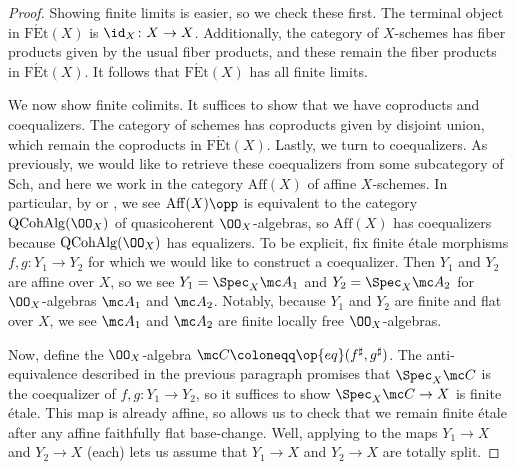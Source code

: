 \documentclass{amsart}
\begin{document}
\begin{proof}
    Showing finite limits is easier, so we check these first. The terminal object in $\mathrm{F\acute Et}(X)$ is $\id_X\colon X\to X$.
    Additionally, the category of $X$-schemes has fiber products given by the usual fiber products, and these remain the fiber products in $\mathrm{F\acute Et}(X)$. It follows that $\mathrm{F\acute Et}(X)$ has all finite limits.

    We now show finite colimits. It suffices to show that we have coproducts and coequalizers. The category of schemes has coproducts given by disjoint union, which remain the coproducts in $\mathrm{F\acute Et}(X)$.
    Lastly, we turn to coequalizers. As previously, we would like to retrieve these coequalizers from some subcategory of $\mathrm{Sch}$, and here we work in the category $\mathrm{Aff}(X)$ of affine $X$-schemes. In particular, by \cite[Exercise~II.5.17]{hartshorne} or \cite[\href{https://stacks.math.columbia.edu/tag/01SA}{Lemma 01SA}]{stacks}, we see $\mathrm{Aff}(X)\opp$ is equivalent to the category $\mathrm{QCohAlg}(\OO_X)$ of quasicoherent $\OO_X$-algebras, so $\mathrm{Aff}(X)$ has coequalizers because $\mathrm{QCohAlg}(\OO_X)$ has equalizers. To be explicit, fix finite \'etale morphisms $f,g\colon Y_1\to Y_2$ for which we would like to construct a coequalizer. Then $Y_1$ and $Y_2$ are affine over $X$, so we see $Y_1=\Spec_X\mc A_1$ and $Y_2=\Spec_X\mc A_2$ for $\OO_X$-algebras $\mc A_1$ and $\mc A_2$. Notably, because $Y_1$ and $Y_2$ are finite and flat over $X$, we see $\mc A_1$ and $\mc A_2$ are finite locally free $\OO_X$-algebras.

    Now, define the $\OO_X$-algebra $\mc C\coloneqq\op{eq}(f^\sharp,g^\sharp)$. The anti-equivalence described in the previous paragraph promises that $\Spec_X\mc C$ is the coequalizer of $f,g\colon Y_1\to Y_2$, so it suffices to show $\Spec_X\mc C\to X$ is finite \'etale. This map is already affine, so  allows us to check that we remain finite \'etale after any affine faithfully flat base-change. Well, applying  to the maps $Y_1\to X$ and $Y_2\to X$ (each) lets us assume that $Y_1\to X$ and $Y_2\to X$ are totally split.


\end{proof}
\end{document}
